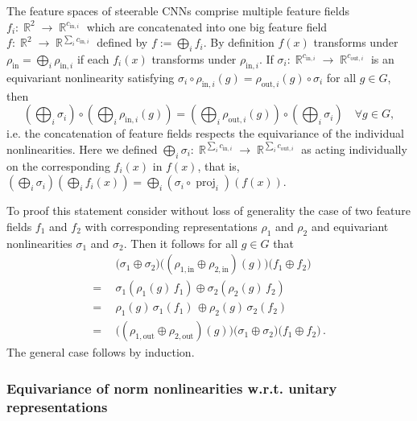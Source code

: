 \documentclass{article}
\DeclareMathOperator*{\R}{\mathbb{R}}
\begin{document}
The feature spaces of steerable CNNs comprise multiple feature fields $f_i:\R^2\to\R^{c_{\text{in},i}}$ which are concatenated into one big feature field $f:\R^2\to\R^{\sum_i c_{\text{in},i}}$ defined by $f:=\bigoplus_i f_i$.
By definition $f(x)$ transforms under $\rho_\text{in}=\bigoplus_i\rho_{\text{in},i}$ if each $f_i(x)$ transforms under $\rho_{\text{in},i}$.
If $\sigma_i:\R^{c_{\text{in},i}}\to\R^{c_{\text{out},i}}$ is an equivariant nonlinearity satisfying $\sigma_i\circ\rho_{\text{in},i}(g) = \rho_{\text{out},i}(g)\circ\sigma_i$ for all $g\in G$, then
\[
      \left(\bigoplus\nolimits_i\sigma_i\right)          \circ \left(\bigoplus\nolimits_i\rho_{\text{in},i}(g)\right)
    = \left(\bigoplus\nolimits_i\rho_{\text{out},i}(g)\right) \circ \left(\bigoplus\nolimits_i\sigma_i\right)
    \quad\forall g\in G,
\]
i.e. the concatenation of feature fields respects the equivariance of the individual nonlinearities.
Here we defined $\bigoplus_i\sigma_i:\R^{\sum_i c_{\text{in},i}} \to \R^{\sum_i c_{\text{out},i}}$ as acting individually on the corresponding $f_i(x)$ in $f(x)$, that is,
$\left(\bigoplus_i\sigma_i\right)\left(\bigoplus_i f_i(x)\right) = \bigoplus_i \left(\sigma_i\circ\operatorname{proj}_i\right)(f(x))$.

To proof this statement consider without loss of generality the case of two feature fields $f_1$ and $f_2$ with corresponding representations $\rho_1$ and $\rho_2$ and equivariant nonlinearities $\sigma_1$ and $\sigma_2$.
Then it follows for all $g\in G$ that
\begin{align*}
         &\big(\sigma_1\oplus\sigma_2\big) \big((\rho_{1,\text{in}}\oplus\rho_{2,\text{in}})(g)\big) \big(f_1\oplus f_2\big) \\
    =\ \ &\sigma_1\left(\rho_1(g)\,f_1\right) \oplus \sigma_2\left(\rho_2(g)\,f_2\right) \\
    =\ \ &\rho_1(g)\,\sigma_1\!\left(f_1\right) \,\oplus \rho_2(g)\,\sigma_2\!\left(f_2\right) \\
    =\ \ &\big((\rho_{1,\text{out}}\oplus\rho_{2,\text{out}})(g)\big) \big(\sigma_1\oplus\sigma_2\big) \big(f_1\oplus f_2\big) \,.
\end{align*}
The general case follows by induction.








\subsubsection{Equivariance of norm nonlinearities w.r.t. unitary representations}
\label{apx:equivariance_nonlin_norm}
\end{document}
